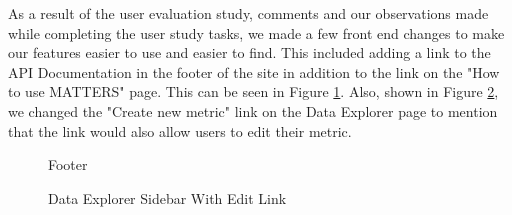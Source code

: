 		As a result of the user evaluation study, comments and our observations made while completing 
		the user study tasks, we made a few front end changes to make our features easier 
		to use and easier to find. This included adding a link to the API Documentation in 
		the footer of the site in addition to the link on the "How to use MATTERS" page. This can be seen 
		in Figure \ref{fig:footer}.  Also, shown in Figure \ref{fig:edit}, we changed the "Create new metric" link on the 
		Data Explorer page to mention that the link would also allow users to edit their metric. 
		
			\begin{figure}[t]
				\centering
					\caption{Footer}
					\label{fig:footer}
			\end{figure}
			
			\begin{figure}[t]
				\centering
					\caption{Data Explorer Sidebar With Edit Link}
					\label{fig:edit}
			\end{figure}
			
